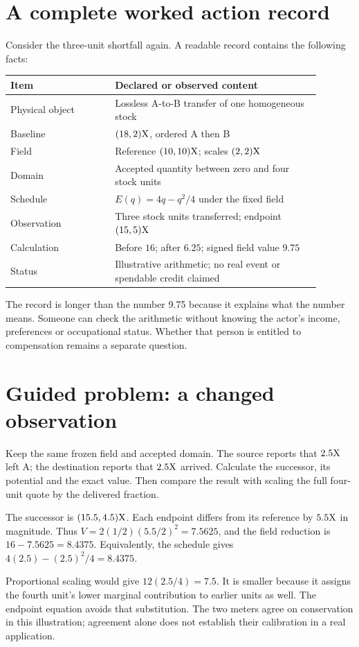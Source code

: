 \section{A complete worked action record}
Consider the three-unit shortfall again. A readable record contains the following facts:
\begin{center}\small
\begin{tabular}{P{0.30\linewidth}P{0.59\linewidth}}\toprule
Item & Declared or observed content\\\midrule
Physical object & Lossless A-to-B transfer of one homogeneous stock\\
Baseline & $(18,2)\mathrm{X}$, ordered A then B\\
Field & Reference $(10,10)\mathrm{X}$; scales $(2,2)\mathrm{X}$\\
Domain & Accepted quantity between zero and four stock units\\
Schedule & $E(q)=4q-q^2/4$ under the fixed field\\
Observation & Three stock units transferred; endpoint $(15,5)\mathrm{X}$\\
Calculation & Before $16$; after $6.25$; signed field value $9.75$\\
Status & Illustrative arithmetic; no real event or spendable credit claimed\\\bottomrule
\end{tabular}
\end{center}
The record is longer than the number 9.75 because it explains what the number means. Someone can check the arithmetic without knowing the actor's income, preferences or occupational status. Whether that person is entitled to compensation remains a separate question.

\section{Guided problem: a changed observation}
Keep the same frozen field and accepted domain. The source reports that $2.5\mathrm{X}$ left A; the destination reports that $2.5\mathrm{X}$ arrived. Calculate the successor, its potential and the exact value. Then compare the result with scaling the full four-unit quote by the delivered fraction.

The successor is $(15.5,4.5)\mathrm{X}$. Each endpoint differs from its reference by $5.5\mathrm{X}$ in magnitude. Thus $V=2(1/2)(5.5/2)^2=7.5625$, and the field reduction is $16-7.5625=8.4375$. Equivalently, the schedule gives $4(2.5)-(2.5)^2/4=8.4375$.

Proportional scaling would give $12(2.5/4)=7.5$. It is smaller because it assigns the fourth unit's lower marginal contribution to earlier units as well. The endpoint equation avoids that substitution. The two meters agree on conservation in this illustration; agreement alone does not establish their calibration in a real application.

